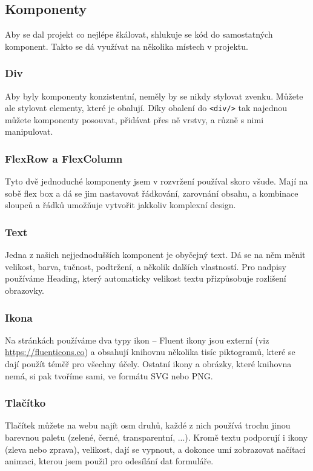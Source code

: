 \subsection{Komponenty}

Aby se dal projekt co nejlépe škálovat, shlukuje se kód do samostatných komponent. Takto se dá využívat na několika místech v projektu.

\subsubsection{Div}
Aby byly komponenty konzistentní, neměly by se nikdy stylovat zvenku. Můžete ale stylovat elementy, které je obalují. Díky obalení do \texttt{<div/>} tak najednou můžete komponenty posouvat, přidávat přes ně vrstvy, a různě s nimi manipulovat.

\subsubsection{FlexRow a FlexColumn}
Tyto dvě jednoduché komponenty jsem v rozvržení používal skoro všude. Mají na sobě flex box a dá se jim nastavovat řádkování, zarovnání obsahu, a kombinace sloupců a řádků umožňuje vytvořit jakkoliv komplexní design.

\subsubsection{Text}
Jedna z našich nejjednodušších komponent je obyčejný text. Dá se na něm měnit velikost, barva, tučnost, podtržení, a několik dalších vlastností. Pro nadpisy používáme Heading, který automaticky velikost textu přizpůsobuje rozlišení obrazovky.

\subsubsection{Ikona}
Na stránkách používáme dva typy ikon – Fluent ikony jsou externí (viz \href{https://fluenticons.co}{https://fluenticons.co}) a obsahují knihovnu několika tisíc piktogramů, které se dají použít téměř pro všechny účely. Ostatní ikony a obrázky, které knihovna nemá, si pak tvoříme sami, ve formátu SVG nebo PNG.

\subsubsection{Tlačítko}
Tlačítek můžete na webu najít osm druhů, každé z nich používá trochu jinou barevnou paletu (zelené, černé, transparentní, ...). Kromě textu podporují i ikony (zleva nebo zprava), velikost, dají se vypnout, a dokonce umí zobrazovat načítací animaci, kterou jsem použil pro odesílání dat formuláře.

